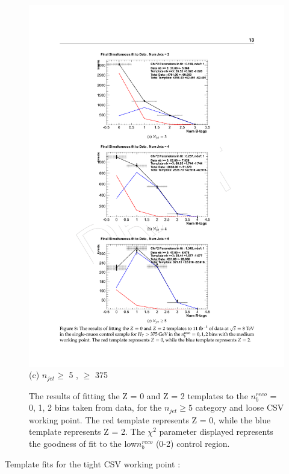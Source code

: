 \begin{figure}[ht]
\begin{minipage}[b]{0.48\linewidth}
\includegraphics[width = 1.0\linewidth]{plots/template_data_medium_njet5_highht.pdf}
\centering (c) $n_{jet} \geq$ 5 , \theht $\geq$ 375 
\end{minipage}
\caption[The results of fitting the Z = 0 and Z = 2 templates to the $n_{b}^{reco}$ = 0, 1, 2 bins taken directly from data, for the $n_{jet} \geq 5$ category and loose \ac{CSV} working point.]{The results of fitting the Z = 0 and Z = 2 templates to the $n_{b}^{reco}$ = 0, 1, 2 bins taken from data, for the $n_{jet} \geq 5$ category and loose \ac{CSV} working point. The red template represents Z = 0, while the blue template represents Z = 2. The $\chi^{2}$ parameter displayed represents the goodness of fit to the low$ n_{b}^{reco}$ (0-2) control region.}
\label{app:template_data_loose_njet5}
\end{figure}
\FloatBarrier

Template fits for the tight \ac{CSV} working point :

